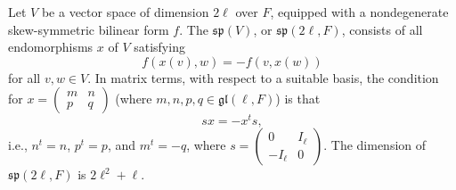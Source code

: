 Let $V$ be a vector space of dimension $2\ell$ over $F$, equipped with a nondegenerate skew-symmetric bilinear form $f$. The  $\mathfrak{sp}(V)$, or $\mathfrak{sp}(2\ell, F)$, consists of all endomorphisms $x$ of $V$ satisfying
$$f(x(v), w) = -f(v, x(w))$$
for all $v, w \in V$. In matrix terms, with respect to a suitable basis, the condition for $x = \begin{pmatrix} m & n \\ p & q \end{pmatrix}$ (where $m, n, p, q \in \mathfrak{gl}(\ell, F)$) is that
$$sx = -x^t s,$$
i.e., $n^t = n$, $p^t = p$, and $m^t = -q$, where $s = \begin{pmatrix} 0 & I_\ell \\ -I_\ell & 0 \end{pmatrix}$. The dimension of $\mathfrak{sp}(2\ell, F)$ is $2\ell^2 + \ell$.
